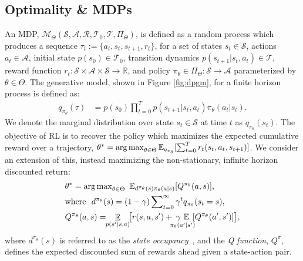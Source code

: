 \label{sec:background}

\subsection{Optimality \& MDPs}\label{mdp_background}
An MDP, $\mathcal{M}_{\Theta}(\mathcal{S},\mathcal{A},\mathcal{R},\mathcal{T}_0,\mathcal{T},\Pi_{\Theta})$, is defined as a random process which produces a sequence $\tau_t := \{a_t,s_t,s_{t+1},r_t\}$, for a set of states $s_t \in \mathcal{S}$, actions $a_t \in \mathcal{A}$, initial state $p(s_0) \in \mathcal{T}_0$, transition dynamics $ p(s_{t+1}|s_t,a_t) \in \mathcal{T}$, reward function $r_t : \mathcal{S} \times \mathcal{A} \times \mathcal{S} \rightarrow  \mathbb{R}$, and policy $\pi_{\theta} \in \Pi_{\Theta} : \mathcal{S} \rightarrow \mathcal{A}$ parameterized by $\theta \in \Theta$. The generative model, shown in Figure \ref{fig:dpgm}, for a finite horizon process is defined as:
\begin{align}
    q_{\pi_{\theta}}(\tau) & = p(s_0)\prod\nolimits_{t=0}^{T}p(s_{t+1}|s_t,a_t)\pi_{\theta}(a_t|s_t).\label{equ:background:mdp}
\end{align}
We denote the marginal distribution over state $s_t \in \mathcal{S}$ at time $t$ as  $q_{\pi_{\theta}}(s_t)$.  The objective of RL is to recover the policy which maximizes the expected cumulative reward over a trajectory, $\theta^* = \operatorname{arg\,max}_{\theta \in \Theta} \mathbb{E}_{q_{\pi_{\theta}}} [\sum_{t=0}^T r_t(s_t,a_t,s_{t+1})]$. We consider an extension of this, instead maximizing the non-stationary, infinite horizon discounted return:
\allowdisplaybreaks
\begin{align}
    & \theta^* = \argmax_{\theta \in \Theta} \ \mathbb{E}_{d^{\pi_{\theta}}(s) \pi_{\theta}(a|s)} [Q^{\pi_\theta}(a,s)], \label{equ:MDP:RL} \\
    & \mathrm{where} \ \ d^{\pi_{\theta}}(s) = (1-\gamma) \sum\nolimits_{t=0}^{\infty} \gamma^t q_{\pi_{\theta}}(s_t=s), \label{eq:background:occ} \\
    & Q^{\pi_{\theta}} (a, s) = \!\! \mathop{\mathbb{E}}_{p(s'|s,a)} \!\!
    \big[ r(s,a,s') + \!\!\! \mathop{\gamma \ \mathbb{E}}_{\pi_{\theta}(a'|s')} \!\! [ Q^{\pi_{\theta}} (a', s') ] \big],
\end{align}
where $d^{\pi_{\theta}}(s)$ is referred to as the \emph{state occupancy}~\cite{pmlr-v125-agarwal20a}, and the \emph{Q function},  $Q^{\pi}$, defines the expected discounted sum of rewards ahead given a state-action pair. 

